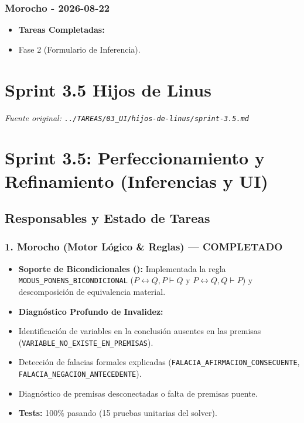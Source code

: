 \documentclass[11pt,a4paper,openany]{book}
\begin{document}
\subsubsection{Morocho - 2026-08-22}
\begin{itemize}[leftmargin=*]
\item \textbf{Tareas Completadas:}
\item Fase 2 (Formulario de Inferencia).
\end{itemize}


\section{Sprint 3.5 Hijos de Linus}
\textit{Fuente original: \texttt{../TAREAS/03\_UI/hijos-de-linus/sprint-3.5.md}}

\section{Sprint 3.5: Perfeccionamiento y Refinamiento (Inferencias y UI)}

\subsection{Responsables y Estado de Tareas}

\subsubsection{1. Morocho (Motor Lógico \& Reglas) ---  COMPLETADO}
\begin{itemize}[leftmargin=*]
\item \textbf{Soporte de Bicondicionales (\texttt{}):} Implementada la regla \texttt{MODUS\_PONENS\_BICONDICIONAL} ($P \leftrightarrow Q, P \vdash Q$ y $P \leftrightarrow Q, Q \vdash P$) y descomposición de equivalencia material.
\item \textbf{Diagnóstico Profundo de Invalidez:}
\item Identificación de variables en la conclusión ausentes en las premisas (\texttt{VARIABLE\_NO\_EXISTE\_EN\_PREMISAS}).
\item Detección de falacias formales explicadas (\texttt{FALACIA\_AFIRMACION\_CONSECUENTE}, \texttt{FALACIA\_NEGACION\_ANTECEDENTE}).
\item Diagnóstico de premisas desconectadas o falta de premisas puente.
\item \textbf{Tests:} 100\% pasando (15 pruebas unitarias del solver).
\end{itemize}
\end{document}
